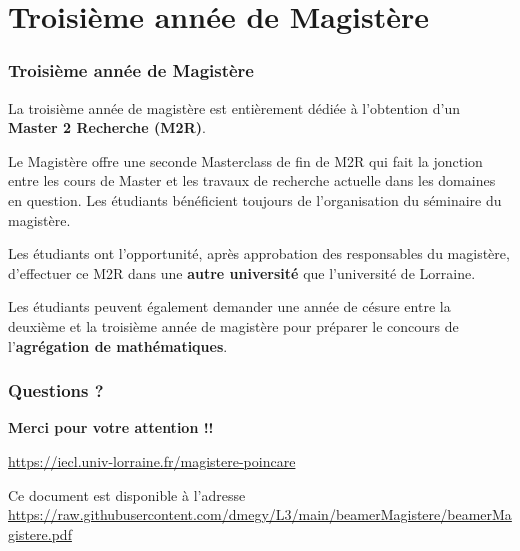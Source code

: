 \documentclass[slidetop,11pt]{beamer}
\begin{document}
\section{Troisième année de Magistère}
\begin{frame}
\frametitle{Troisième année de Magistère}

La troisième année de magistère est entièrement dédiée à l'obtention d'un \textbf{Master 2 Recherche (M2R)}.

Le Magistère offre une seconde Masterclass de fin de M2R qui fait la jonction entre les cours de Master et les travaux de recherche actuelle dans les domaines en question. Les étudiants bénéficient toujours de l'organisation du séminaire du magistère.

\bigskip
Les étudiants ont l'opportunité, après approbation des responsables du magistère, d'effectuer ce M2R dans une \textbf{autre université} que l'université de Lorraine.

\bigskip
Les étudiants peuvent également demander une année de césure entre la deuxième et la troisième année de magistère pour préparer le concours de l'\textbf{agrégation de mathématiques}.

\end{frame}


\begin{frame}
\frametitle{Questions ?}

\begin{center}
{\LARGE \bf Merci pour votre attention !!}

\bigskip
{}

\bigskip
\url{https://iecl.univ-lorraine.fr/magistere-poincare}

\bigskip
Ce document est disponible à l'adresse\\
\url{https://raw.githubusercontent.com/dmegy/L3/main/beamerMagistere/beamerMagistere.pdf}
\end{center}
\end{frame}
  
\end{document}

